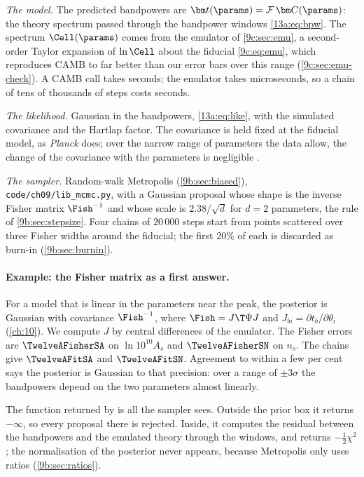 \emph{The model.} The predicted bandpowers are $\bm t(\params)=\mathcal F\,\bm C(\params)$: the theory spectrum passed through the
bandpower windows \eqref{13a:eq:bpw}. The spectrum $\Cell(\params)$ comes from the emulator of \cref{9c:sec:emu}, a second-order
Taylor expansion of $\ln\Cell$ about the fiducial \eqref{9c:eq:emu}, which reproduces CAMB to far better than our error bars
over this range (\cref{9c:sec:emu-check}). A CAMB call takes seconds; the emulator takes microseconds, so a chain of tens
of thousands of steps costs seconds.

\emph{The likelihood.} Gaussian in the bandpowers, \eqref{13a:eq:like}, with the simulated covariance and the Hartlap factor.
The covariance is held fixed at the fiducial model, as \textit{Planck} does; over the narrow range of parameters the data
allow, the change of the covariance with the parameters is negligible \cite{HamimecheLewis2008}.

\emph{The sampler.} Random-walk Metropolis (\cref{9b:sec:biased}), \texttt{code/ch09/lib\_mcmc.py}, with a Gaussian proposal
whose shape is the inverse Fisher matrix $\Fish^{-1}$ and whose scale is $2.38/\sqrt d$ for $d=2$ parameters, the rule of
\cref{9b:sec:stepsize}. Four chains of $20\,000$ steps start from points scattered over three Fisher widths around the
fiducial; the first $20\%$ of each is discarded as burn-in (\cref{9b:sec:burnin}).

\paragraph{Example: the Fisher matrix as a first answer.} For a model that is linear in the parameters near the peak, the
posterior is Gaussian with covariance $\Fish^{-1}$, where $\Fish=J\T\Psi J$ and $J_{bi}=\partial t_b/\partial\theta_i$
(\cref{ch:10}). We compute $J$ by central differences of the emulator. The Fisher errors are $\TwelveAFisherSA$ on
$\ln10^{10}A_s$ and $\TwelveAFisherSN$ on $n_s$. The chains give $\TwelveAFitSA$ and $\TwelveAFitSN$. Agreement to within a few per cent says the posterior is Gaussian to that precision: over a range of $\pm3\sigma$ the bandpowers depend on the two parameters
almost linearly.


\noindent The function returned by  is all the sampler sees. Outside the prior box it returns $-\infty$, so
every proposal there is rejected. Inside, it computes the residual between the bandpowers and the emulated theory through the
windows, and returns $-\tfrac12\chi^2$; the normalisation of the posterior never appears, because Metropolis only uses ratios
(\cref{9b:sec:ratios}).

